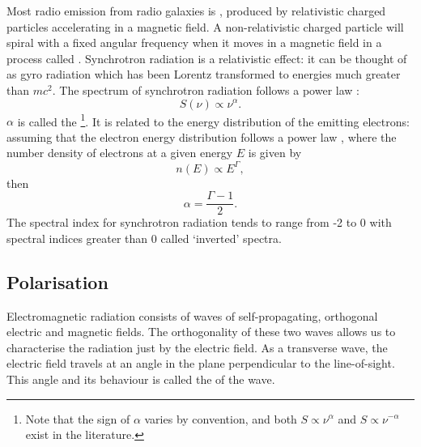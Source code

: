         Most radio emission from radio galaxies is , produced by relativistic charged particles accelerating in a magnetic field. A non-relativistic charged particle will spiral with a fixed angular frequency when it moves in a magnetic field in a process called . Synchrotron radiation is a relativistic effect: it can be thought of as gyro radiation which has been Lorentz transformed to energies much greater than $mc^2$. The spectrum of synchrotron radiation follows a power law \citep{condon_essential_2016}:
        \begin{equation}
            \label{eq:spectral-index}
            S(\nu) \propto \nu^{\alpha}.
        \end{equation}
        $\alpha$ is called the \footnote{Note that the sign of $\alpha$ varies by convention, and both $S \propto \nu^{\alpha}$ and $S \propto \nu^{-\alpha}$ exist in the literature.}. It is related to the energy distribution of the emitting electrons: assuming that the electron energy distribution follows a power law \citep[which it generally does,][]{rybicki_radiative_2008}, where the number density of electrons at a given energy $E$ is given by
        \begin{equation}
            n(E) \propto E^\Gamma,
        \end{equation}
        then
        \begin{equation}
            \alpha = \frac{\Gamma - 1}{2}.
        \end{equation}
        The spectral index for synchrotron radiation tends to range from -2 to 0 \citep{condon_essential_2016} with spectral indices greater than 0 called `inverted' spectra.

    \subsection{Polarisation}
    \label{sec:polarisation}

        Electromagnetic radiation consists of waves of self-propagating, orthogonal electric and magnetic fields. The orthogonality of these two waves allows us to characterise the radiation just by the electric field. As a transverse wave, the electric field travels at an angle in the plane perpendicular to the line-of-sight. This angle and its behaviour is called the  of the wave.

